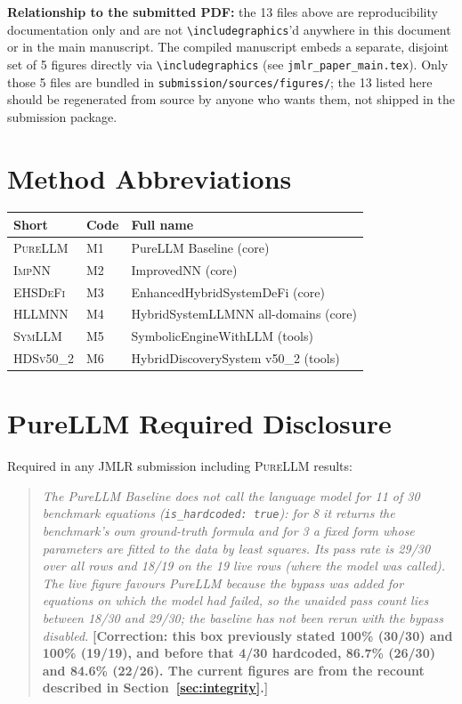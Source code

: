 \documentclass[twoside,11pt]{article}
\newcommand{\PureLLM}{\textsc{PureLLM}}
\newcommand{\INN}{\textsc{ImpNN}}
\newcommand{\EHD}{\textsc{EHSDeFi}}
\newcommand{\HSL}{\textsc{HLLMNN}}
\newcommand{\SEL}{\textsc{SymLLM}}
\newcommand{\HDS}{\textsc{HDSv50\_2}}
\begin{document}
\noindent\textbf{Relationship to the submitted PDF:} the 13 files
above are reproducibility documentation only and are not
\verb|\includegraphics|'d anywhere in this document or in the main
manuscript. The compiled manuscript embeds a separate, disjoint set
of 5 figures directly via \verb|\includegraphics| (see
\texttt{jmlr\_paper\_main.tex}). Only those 5 files are bundled in
\texttt{submission/sources/figures/}; the 13 listed here should be
regenerated from source by anyone who wants them, not shipped in the
submission package.

\section{Method Abbreviations}
\label{app:abbrev}

\begin{tabular}{L{1.8cm} L{2.5cm} L{6.0cm}}
\toprule
\textbf{Short} & \textbf{Code} & \textbf{Full name}\\
\midrule
\PureLLM & M1 & PureLLM Baseline (core)\\
\INN     & M2 & ImprovedNN (core)\\
\EHD     & M3 & EnhancedHybridSystemDeFi (core)\\
\HSL     & M4 & HybridSystemLLMNN all-domains (core)\\
\SEL     & M5 & SymbolicEngineWithLLM (tools)\\
\HDS     & M6 & HybridDiscoverySystem v50\_2 (tools)\\
\bottomrule
\end{tabular}

\section{PureLLM Required Disclosure}
\label{app:disclosure}

Required in any JMLR submission including \PureLLM{} results:

\begin{quote}
\textit{The PureLLM Baseline does not call the language model for 11 of 30
benchmark equations (\texttt{is\_hardcoded: true}): for 8 it returns the benchmark's own
ground-truth formula and for 3 a fixed form whose parameters are fitted to the data by
least squares. Its pass rate is 29/30 over all rows and 18/19 on the 19 live rows
(where the model was called). The live figure favours PureLLM because the bypass
was added for equations on which the model had failed, so the unaided pass count
lies between 18/30 and 29/30; the baseline has not been rerun with the bypass disabled.}
\textbf{[Correction: this box previously stated 100\% (30/30) and 100\% (19/19), and before that
4/30 hardcoded, 86.7\% (26/30) and 84.6\% (22/26). The current figures are from the recount
described in Section~\ref{sec:integrity}.]}
\end{quote}
\end{document}

